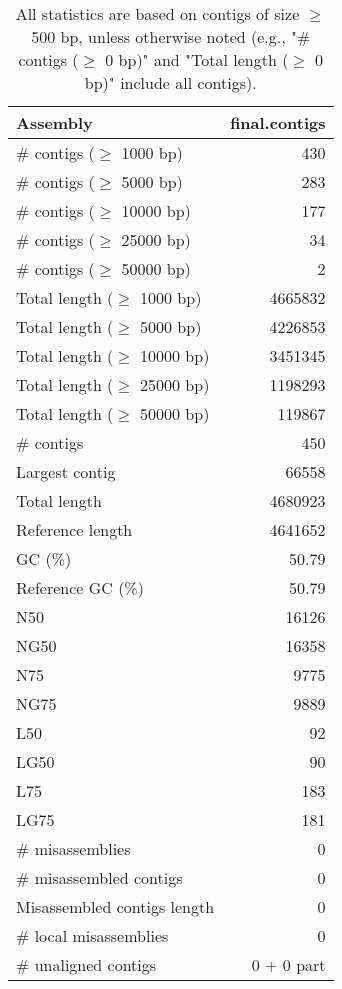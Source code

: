 \documentclass[12pt,a4paper]{article}
\begin{document}
\begin{table}[ht]
\begin{center}
\caption{All statistics are based on contigs of size $\geq$ 500 bp, unless otherwise noted (e.g., "\# contigs ($\geq$ 0 bp)" and "Total length ($\geq$ 0 bp)" include all contigs).}
\begin{tabular}{|l*{1}{|r}|}
\hline
Assembly & final.contigs \\ \hline
\# contigs ($\geq$ 1000 bp) & 430 \\ \hline
\# contigs ($\geq$ 5000 bp) & 283 \\ \hline
\# contigs ($\geq$ 10000 bp) & 177 \\ \hline
\# contigs ($\geq$ 25000 bp) & 34 \\ \hline
\# contigs ($\geq$ 50000 bp) & 2 \\ \hline
Total length ($\geq$ 1000 bp) & 4665832 \\ \hline
Total length ($\geq$ 5000 bp) & 4226853 \\ \hline
Total length ($\geq$ 10000 bp) & 3451345 \\ \hline
Total length ($\geq$ 25000 bp) & 1198293 \\ \hline
Total length ($\geq$ 50000 bp) & 119867 \\ \hline
\# contigs & 450 \\ \hline
Largest contig & 66558 \\ \hline
Total length & 4680923 \\ \hline
Reference length & 4641652 \\ \hline
GC (\%) & 50.79 \\ \hline
Reference GC (\%) & 50.79 \\ \hline
N50 & 16126 \\ \hline
NG50 & 16358 \\ \hline
N75 & 9775 \\ \hline
NG75 & 9889 \\ \hline
L50 & 92 \\ \hline
LG50 & 90 \\ \hline
L75 & 183 \\ \hline
LG75 & 181 \\ \hline
\# misassemblies & 0 \\ \hline
\# misassembled contigs & 0 \\ \hline
Misassembled contigs length & 0 \\ \hline
\# local misassemblies & 0 \\ \hline
\# unaligned contigs & 0 + 0 part \\ \hline

\end{tabular}
\end{center}
\end{table}
\end{document}
